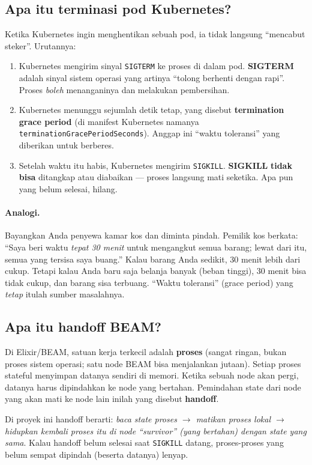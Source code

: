 \documentclass[11pt]{article}
\newcommand{\code}[1]{\texttt{\small #1}}
\newcommand{\istilah}[1]{\textbf{#1}}
\begin{document}
\subsection{Apa itu terminasi pod Kubernetes?}
Ketika Kubernetes ingin menghentikan sebuah pod, ia tidak langsung ``mencabut steker''. Urutannya:
\begin{enumerate}
  \item Kubernetes mengirim sinyal \code{SIGTERM} ke proses di dalam pod. \istilah{SIGTERM} adalah
  sinyal sistem operasi yang artinya ``tolong berhenti dengan rapi''. Proses \emph{boleh} menanganinya
  dan melakukan pembersihan.
  \item Kubernetes menunggu sejumlah detik tetap, yang disebut \istilah{termination grace period}
  (di manifest Kubernetes namanya \code{terminationGracePeriodSeconds}). Anggap ini ``waktu toleransi''
  yang diberikan untuk berberes.
  \item Setelah waktu itu habis, Kubernetes mengirim \code{SIGKILL}. \istilah{SIGKILL} \textbf{tidak
  bisa} ditangkap atau diabaikan --- proses langsung mati seketika. Apa pun yang belum selesai, hilang.
\end{enumerate}

\paragraph{Analogi.} Bayangkan Anda penyewa kamar kos dan diminta pindah. Pemilik kos berkata:
``Saya beri waktu \emph{tepat 30 menit} untuk mengangkut semua barang; lewat dari itu, semua yang
tersisa saya buang.'' Kalau barang Anda sedikit, 30 menit lebih dari cukup. Tetapi kalau Anda baru
saja belanja banyak (beban tinggi), 30 menit bisa tidak cukup, dan barang sisa terbuang. ``Waktu
toleransi'' (grace period) yang \emph{tetap} itulah sumber masalahnya.

\subsection{Apa itu handoff BEAM?}
Di Elixir/BEAM, satuan kerja terkecil adalah \istilah{proses} (sangat ringan, bukan proses sistem
operasi; satu node BEAM bisa menjalankan jutaan). Setiap proses stateful menyimpan datanya sendiri di
memori. Ketika sebuah node akan pergi, datanya harus dipindahkan ke node yang bertahan. Pemindahan
state dari node yang akan mati ke node lain inilah yang disebut \istilah{handoff}.

Di proyek ini handoff berarti: \emph{baca state proses $\rightarrow$ matikan proses lokal $\rightarrow$
hidupkan kembali proses itu di node ``survivor'' (yang bertahan) dengan state yang sama}. Kalau handoff
belum selesai saat \code{SIGKILL} datang, proses-proses yang belum sempat dipindah (beserta datanya)
lenyap.
\end{document}
